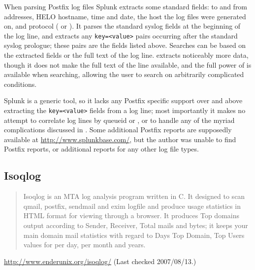 When parsing Postfix log files Splunk extracts some standard fields: to and
from addresses, HELO hostname, time and date, the host the log files were
generated on, and protocol (\SMTP{} or \ESMTP{}).  It parses the standard
syslog fields at the beginning of the log line, and extracts any
\texttt{key=<value>} pairs occurring after the standard syslog prologue;
these pairs are the fields listed above.  Searches can be based on the
extracted fields or the full text of the log line.  \parsername{} extracts
noticeably more data, though it does not make the full text of the line
available, and the full power of \SQL{} is available when searching,
allowing the user to search on arbitrarily complicated conditions.

Splunk is a generic tool, so it lacks any Postfix specific support over and
above extracting the \texttt{key=<value>} fields from a log line; most
importantly it makes no attempt to correlate log lines by queueid or
\pid{}, or to handle any of the myriad complications discussed in
.  Some additional Postfix reports are supposedly
available at \url{http://www.splunkbase.com/}, but the author was unable to
find Postfix reports, or additional reports for any other log file types.

\newpage{}

\subsection{Isoqlog}

\begin{quotation}

    Isoqlog is an MTA log analysis program written in C. It designed to
    scan qmail, postfix, sendmail and exim logfile and produce usage
    statistics in HTML format for viewing through a browser. It produces
    Top domains output according to Sender, Receiver, Total mails and
    bytes; it keeps your main domain mail statistics with regard to Days
    Top Domain, Top Users values for per day, per month and years.

\end{quotation}

\noindent{}\url{http://www.enderunix.org/isoqlog/} \newline{}
(Last checked 2007/08/13.)

